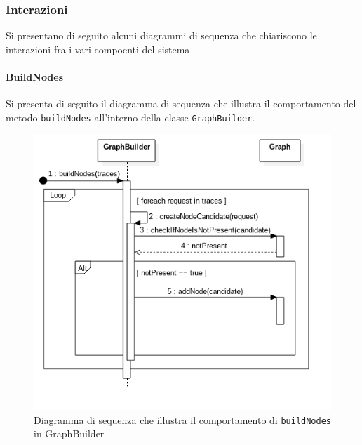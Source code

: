 
\subsubsection{Interazioni}
\label{sec:diagrammiSequenza}
Si presentano di seguito alcuni diagrammi di sequenza che chiariscono le interazioni fra i vari compoenti del sistema

\paragraph{BuildNodes} \Spazio
Si presenta di seguito il diagramma di sequenza che illustra il comportamento del metodo \texttt{buildNodes} all'interno della classe \texttt{GraphBuilder}.
\begin{figure}[H]
	\centering
	\includegraphics[width=1\textwidth]{Images/SequenceBuildNodes.png}
	\caption{Diagramma di sequenza che illustra il comportamento di \texttt{buildNodes} in GraphBuilder}
	\label{img:sequenceBuildNodes}
\end{figure}

